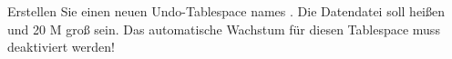     \item Erstellen Sie einen neuen Undo-Tablespace names . Die Datendatei soll  hei\ss{}en und 20 M gro\ss{} sein. Das automatische Wachstum f\"ur diesen Tablespace muss deaktiviert werden!
